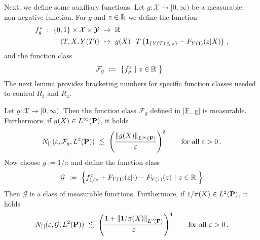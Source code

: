 Next, we define some auxiliary functions.
Let
  $
  g
  :
  \mathcal{X}\to [0,\infty)
  $
  be a measurable, non-negative function.
  For $g$ and $z\in\R$ we define the function
  \begin{align*}
    f_{g}^z
    \ 
    :
    \ 
      \left\{ 0,1 \right\}
      \times
      \mathcal{X}
      \times
      \mathcal{Y}
    &
    \ 
    \to
    \ 
    \R
    \\
      (T,X,Y(T))
    &
      \ 
      \mapsto
      \ 
      g(X)
      \cdot
      T
      \left( 
        \mathbf{1}
        _{\left\{  Y(T)\,\le\,z \right\}}
        -
        F_{Y(1)}(z|X)
      \right)
      \,,
  \end{align*}
  and the function class 
  \begin{gather}
    \label{F_g}
    \mathcal{F}_g
    \ 
    :=
    \ 
    \left\{ 
      f_{g}^z
      \ 
      |
      \ 
      z\in\R\ 
    \right\}
    \,.
  \end{gather}
The next lemma provides bracketing numbers for specific function classes needed to control $R_3$ and $R_4$.
\newpage
\begin{lemma}
Let
  $
  g
  :
  \mathcal{X}\to [0,\infty)
  $. 
  Then the function class $\mathcal{F}_g$ defined in \eqref{F_g} is measurable.
  Furthermore, if $g(X)\in L^\infty(\P)$, it holds 
  \begin{gather*}
    N_{[\,]}
    (
    \varepsilon
    ,
    \mathcal{F}_g, L^2(\P))
    \ 
    \lesssim
    \ 
    \left( 
    \frac{\norm{g(X)}_{ L^\infty(\P)}}{\varepsilon}
    \right)^2
    \qquad
    \text{for all}
    \ 
    \varepsilon>0
    \,.
  \end{gather*}
  Now choose $g:=1/\pi$ and define the function class
  \begin{gather*}
    \mathcal{G}
    \ 
    :=
    \ 
    \left\{ 
      f_{1/\pi}^z
      +
      F_{Y(1)}(z|\cdot)
      -
      F_{Y(1)}(z)
      \ 
      |
      \ 
      z\in\R\ 
    \right\}
  \end{gather*}
  Then $\mathcal{G}$ is a class of measurable functions. 
  Furthermore, if $1/\pi(X)\in L^2(\P)$, it holds 
  \begin{gather*}
    N_{[\,]}
    (
    \varepsilon
    ,
    \mathcal{G}, L^2(\P))
    \ 
    \lesssim
    \ 
    \left( 
    \frac{
      1+
    \norm{1/\pi(X)}_{ L^2(\P)}
    }
    {\varepsilon}
    \right)^4
    \qquad
    \text{for all}
    \ 
    \varepsilon>0
    \,.
  \end{gather*}
\end{lemma}
